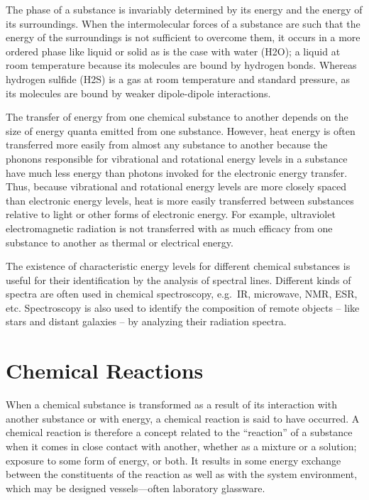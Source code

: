 \documentclass[
]{book}
\begin{document}
The phase of a substance is invariably determined by its energy and the energy of its surroundings. When the intermolecular forces of a substance are such that the energy of the surroundings is not sufficient to overcome them, it occurs in a more ordered phase like liquid or solid as is the case with water (H2O); a liquid at room temperature because its molecules are bound by hydrogen bonds. Whereas hydrogen sulfide (H2S) is a gas at room temperature and standard pressure, as its molecules are bound by weaker dipole-dipole interactions.

The transfer of energy from one chemical substance to another depends on the size of energy quanta emitted from one substance. However, heat energy is often transferred more easily from almost any substance to another because the phonons responsible for vibrational and rotational energy levels in a substance have much less energy than photons invoked for the electronic energy transfer. Thus, because vibrational and rotational energy levels are more closely spaced than electronic energy levels, heat is more easily transferred between substances relative to light or other forms of electronic energy. For example, ultraviolet electromagnetic radiation is not transferred with as much efficacy from one substance to another as thermal or electrical energy.

The existence of characteristic energy levels for different chemical substances is useful for their identification by the analysis of spectral lines. Different kinds of spectra are often used in chemical spectroscopy, e.g.~IR, microwave, NMR, ESR, etc. Spectroscopy is also used to identify the composition of remote objects -- like stars and distant galaxies -- by analyzing their radiation spectra.

\hypertarget{chemical-reactions}{%
\section{Chemical Reactions}\label{chemical-reactions}}

When a chemical substance is transformed as a result of its interaction with another substance or with energy, a chemical reaction is said to have occurred. A chemical reaction is therefore a concept related to the ``reaction'' of a substance when it comes in close contact with another, whether as a mixture or a solution; exposure to some form of energy, or both. It results in some energy exchange between the constituents of the reaction as well as with the system environment, which may be designed vessels---often laboratory glassware.
\end{document}
